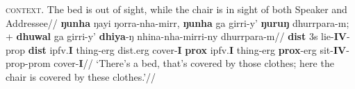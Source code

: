 %

\begingl
\glpreamble\textsc{context.} The bed is out of sight, while the chair is in sight of both Speaker and Addressee//
\gla \textbf{ŋunha} ŋayi ŋorra-nha-mirr, \textbf{ŋunha} ga girri-y' \textbf{ŋuruŋ} dhurrpara-m; + \textbf{dhuwal} ga girri-y' \textbf{dhiya}-ŋ nhina-nha-mirri-ny dhurrpara-m//
\glb \textbf{\gls{dist}} 3s lie-\textbf{IV}-\gls{prop} \textbf{\gls{dist}} \gls{ipfv}.\textbf{I} thing-\gls{erg} \gls{dist}.\gls{erg} cover-\textbf{I} \textbf{\gls{prox}} \gls{ipfv}.\textbf{I} thing-\gls{erg} \textbf{\gls{prox}}-\gls{erg} sit-\textbf{IV}-\gls{prop}-\gls{prom} cover-\textbf{I}//
\glft`There's a bed, that's covered by those clothes; here the chair is covered by these clothes.'//\endgl
\xe

